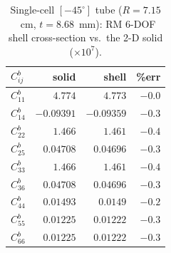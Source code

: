 \begin{table}[htpb]
\centering
\caption{Single-cell $[-45^\circ]$ tube ($R=7.15$~cm, $t=8.68$~mm): RM 6-DOF shell cross-section vs.\ the 2-D solid ($\times10^{7}$).}
\label{tab:single}
\begin{tabular}{l rrr}
\hline
$C^{b}_{ij}$ & solid & shell & \%err \\
\hline
$C^{b}_{11}$ & $4.774$ & $4.773$ & $-0.0$ \\
$C^{b}_{14}$ & $-0.09391$ & $-0.09359$ & $-0.3$ \\
$C^{b}_{22}$ & $1.466$ & $1.461$ & $-0.4$ \\
$C^{b}_{25}$ & $0.04708$ & $0.04696$ & $-0.3$ \\
$C^{b}_{33}$ & $1.466$ & $1.461$ & $-0.4$ \\
$C^{b}_{36}$ & $0.04708$ & $0.04696$ & $-0.3$ \\
$C^{b}_{44}$ & $0.01493$ & $0.0149$ & $-0.2$ \\
$C^{b}_{55}$ & $0.01225$ & $0.01222$ & $-0.3$ \\
$C^{b}_{66}$ & $0.01225$ & $0.01222$ & $-0.3$ \\
\hline
\end{tabular}
\end{table}